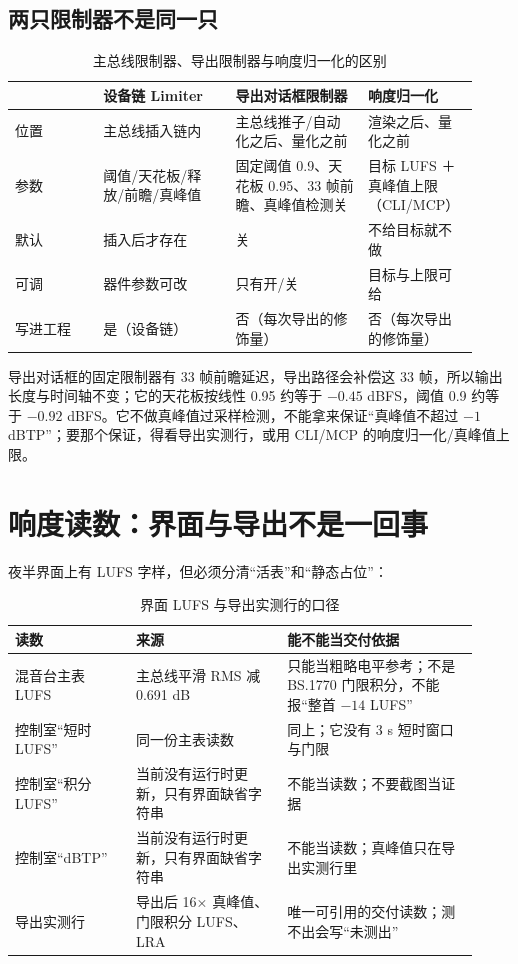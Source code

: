\subsection{两只限制器不是同一只}

\begin{table}[htbp]
\centering
\small
\begin{tabular}{@{}p{0.18\linewidth}p{0.27\linewidth}p{0.27\linewidth}p{0.20\linewidth}@{}}
\hline
 & 设备链 Limiter & 导出对话框限制器 & 响度归一化 \\
\hline
位置 & 主总线插入链内 & 主总线推子/自动化之后、量化之前 & 渲染之后、量化之前 \\
参数 & 阈值/天花板/释放/前瞻/真峰值 & 固定阈值 0.9、天花板 0.95、33 帧前瞻、真峰值检测关 & 目标 LUFS ＋ 真峰值上限（CLI/MCP） \\
默认 & 插入后才存在 & 关 & 不给目标就不做 \\
可调 & 器件参数可改 & 只有开/关 & 目标与上限可给 \\
写进工程 & 是（设备链） & 否（每次导出的修饰量） & 否（每次导出的修饰量） \\
\hline
\end{tabular}
\caption{主总线限制器、导出限制器与响度归一化的区别}
\label{tab:limiters}
\end{table}

导出对话框的固定限制器有 33 帧前瞻延迟，导出路径会补偿这 33 帧，所以输出长度与时间轴不变；它的天花板按线性 0.95 约等于 $-0.45$ dBFS，阈值 0.9 约等于 $-0.92$ dBFS。它不做真峰值过采样检测，不能拿来保证“真峰值不超过 $-1$ dBTP”；要那个保证，得看导出实测行，或用 CLI/MCP 的响度归一化/真峰值上限。

\section{响度读数：界面与导出不是一回事}

夜半界面上有 LUFS 字样，但必须分清“活表”和“静态占位”：

\begin{table}[htbp]
\centering
\small
\begin{tabular}{@{}p{0.24\linewidth}p{0.30\linewidth}p{0.38\linewidth}@{}}
\hline
读数 & 来源 & 能不能当交付依据 \\
\hline
混音台主表 LUFS & 主总线平滑 RMS 减 0.691 dB & 只能当粗略电平参考；不是 BS.1770 门限积分，不能报“整首 $-14$ LUFS” \\
控制室“短时 LUFS” & 同一份主表读数 & 同上；它没有 3 s 短时窗口与门限 \\
控制室“积分 LUFS” & 当前没有运行时更新，只有界面缺省字符串 & 不能当读数；不要截图当证据 \\
控制室“dBTP” & 当前没有运行时更新，只有界面缺省字符串 & 不能当读数；真峰值只在导出实测行里 \\
导出实测行 & 导出后 16× 真峰值、门限积分 LUFS、LRA & 唯一可引用的交付读数；测不出会写“未测出” \\
\hline
\end{tabular}
\caption{界面 LUFS 与导出实测行的口径}
\label{tab:loudness-readings}
\end{table}

